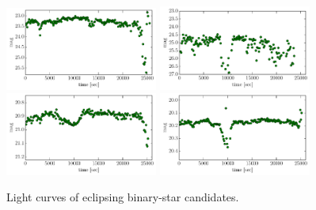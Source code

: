 \documentclass[iop, apj]{emulateapj}
\newcommand{\?}{\stackrel{?}{=}}
\begin{document}
\begin{figure}[htbp]
\includegraphics[width=5cm,clip,angle=90]{pic/eclipse/cand_21.pdf}
\includegraphics[width=5cm,clip,angle=90]{pic/eclipse/cand_22.pdf}
\includegraphics[width=5cm,clip,angle=90]{pic/eclipse/cand_23.pdf}
\includegraphics[width=5cm,clip,angle=90]{pic/eclipse/cand_24.pdf}
\caption{{\small
Light curves of eclipsing binary-star candidates.
}}
\label{fig:candeclipse}
\end{figure}
\end{document}
